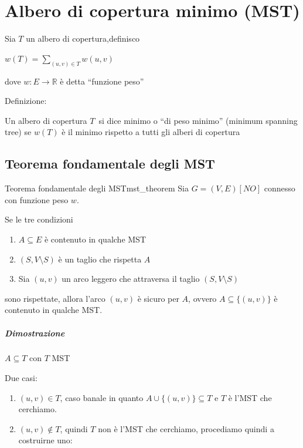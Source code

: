 \chapter{Albero di copertura minimo (MST)}

{Sia $T$ un albero di copertura,definisco}

$w(T) = \sum_{(u,v)\in T}{w(u,v)}$

{dove $w:E\rightarrow \mathbb{R}$ è detta ``funzione peso''}

{Definizione:}

{Un albero di copertura }$T${~si dice minimo o ``di peso minimo'' (minimum spanning tree) se $w(T)$ è il minimo rispetto a tutti gli alberi di copertura}


\section{Teorema fondamentale degli MST}

\begin{teorema}{Teorema fondamentale degli MST}{mst_theorem}
{Sia $G=(V,E) [NO]$ connesso con funzione peso $w$.}

{Se le tre condizioni}

\begin{enumerate}
\tightlist
\item
  {$A \subseteq E$ è contenuto in qualche MST}
\item
  {$(S,V \setminus S)$ è un taglio che rispetta $A$}
\item
  {Sia $(u,v)$ un arco leggero che attraversa il taglio $(S,V \setminus S)$}
\end{enumerate}

{sono rispettate, allora l'arco $(u,v)$ è sicuro per $A$, ovvero $A \subseteq \{(u,v)\}$ è contenuto in qualche MST.}

\end{teorema}

\paragraph{Dimostrazione}

{$A \subseteq T$ con $T$ MST}

{Due casi:}

\begin{enumerate}
\tightlist
\item
  {$(u,v) \in T$, caso banale in quanto $A \cup \{(u,v)\} \subseteq T$  e $T$ è l'MST che cerchiamo.}
\item
  {$(u,v) \notin T$, quindi $T$ non è l'MST che cerchiamo, procediamo quindi a costruirne uno:}
\end{enumerate}

